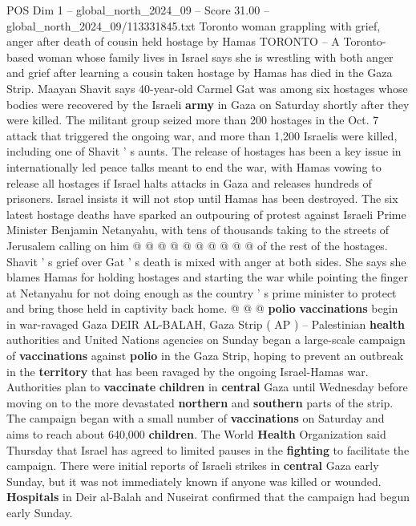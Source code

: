 \begin{textsample}{POS Dim 1 – global\_north\_2024\_09 – Score 31.00 – global\_north\_2024\_09/113331845.txt}  \label{ex:f1_pos_421}
Toronto woman grappling with grief, anger after death of cousin held hostage by Hamas TORONTO -- A Toronto-based woman whose family lives in Israel says she is wrestling with both anger and grief after learning a cousin taken hostage by Hamas has died in the Gaza Strip.
Maayan Shavit says 40-year-old Carmel Gat was among six hostages whose bodies were recovered by the Israeli \textbf{army} in Gaza on Saturday shortly after they were killed.
The militant group seized more than 200 hostages in the Oct. 7 attack that triggered the ongoing war, and more than 1,200 Israelis were killed, including one of Shavit ' s aunts.
The release of hostages has been a key issue in internationally led peace talks meant to end the war, with Hamas vowing to release all hostages if Israel halts attacks in Gaza and releases hundreds of prisoners.
Israel insists it will not stop until Hamas has been destroyed.
The six latest hostage deaths have sparked an outpouring of protest against Israeli Prime Minister Benjamin Netanyahu, with tens of thousands taking to the streets of Jerusalem calling on him @ @ @ @ @ @ @ @ @ @ of the rest of the hostages.
Shavit ' s grief over Gat ' s death is mixed with anger at both sides.
She says she blames Hamas for holding hostages and starting the war while pointing the finger at Netanyahu for not doing enough as the country ' s prime minister to protect and bring those held in captivity back home. @ @ @ \textbf{polio} \textbf{vaccinations} begin in war-ravaged Gaza DEIR AL-BALAH, Gaza Strip ( AP ) -- Palestinian \textbf{health} authorities and United Nations agencies on Sunday began a large-scale campaign of \textbf{vaccinations} against \textbf{polio} in the Gaza Strip, hoping to prevent an outbreak in the \textbf{territory} that has been ravaged by the ongoing Israel-Hamas war.
Authorities plan to \textbf{vaccinate} \textbf{children} in \textbf{central} Gaza until Wednesday before moving on to the more devastated \textbf{northern} and \textbf{southern} parts of the strip.
The campaign began with a small number of \textbf{vaccinations} on Saturday and aims to reach about 640,000 \textbf{children}.
The World \textbf{Health} Organization said Thursday that Israel has agreed to limited pauses in the \textbf{fighting} to facilitate the campaign.
There were initial reports of Israeli strikes in \textbf{central} Gaza early Sunday, but it was not immediately known if anyone was killed or wounded. \textbf{Hospitals} in Deir al-Balah and Nuseirat confirmed that the campaign had begun early Sunday.

\end{textsample}
